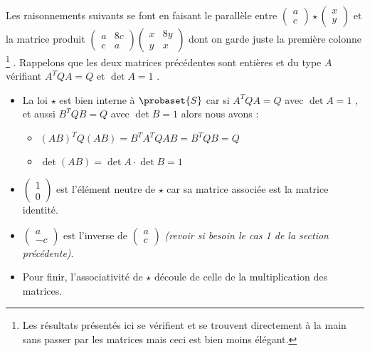 \medskip

Les raisonnements suivants se font en faisant le parallèle entre 
$\begin{pmatrix} 
  a \\ 
  c 
\end{pmatrix}
\star
\begin{pmatrix} 
  x \\ 
  y 
\end{pmatrix}$
et la matrice produit
$\begin{pmatrix} 
  a & 8c \\ 
  c & a 
\end{pmatrix}
\begin{pmatrix} 
  x & 8y \\ 
  y & x 
\end{pmatrix}$
dont on garde juste la première colonne
\footnote{
	Les résultats présentés ici se vérifient et se trouvent directement à la main sans passer par les matrices mais ceci est bien moins élégant.
} .
Rappelons que les deux matrices précédentes sont entières et du type $A$ vérifiant $A^T Q A = Q$ et $\det A = 1$ .


\begin{itemize}[label=\small\textbullet]
	\item La loi $\star$ est bien interne à $\probaset{S}$ car si $A^T Q A = Q$ avec $\det A = 1$ , et aussi $B^T Q B = Q$ avec $\det B = 1$ alors nous avons :
	
	\begin{itemize}[label=\raisebox{.3ex}{$\centerdot$}]
		\item $(AB)^T Q (AB) = B^T A^T Q A B = B^T Q B = Q$
		
		\medskip
		\item $\det(AB) = \det A \cdot \det B = 1$
	\end{itemize}


	\medskip
	\item
	$\begin{pmatrix} 
	  1 \\ 
	  0 
	\end{pmatrix}$
	est l'élément neutre de $\star$ car sa matrice associée est la matrice identité.


	\medskip
	\item
	$\begin{pmatrix} 
	  a  \\ 
	  -c 
	\end{pmatrix}$
	est l'inverse de
	$\begin{pmatrix} 
	  a \\ 
	  c 
	\end{pmatrix}$
	\textit{(revoir si besoin le cas 1 de la section précédente)}.


	\medskip
	\item Pour finir, l'associativité de $\star$ découle de celle de la multiplication des matrices.
\end{itemize}
